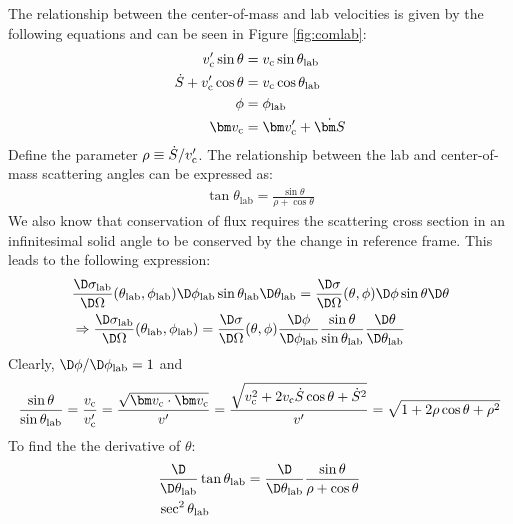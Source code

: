 \documentclass[fleqn, 12pt]{article}
\begin{document}
\begin{enumerate}
  The relationship between the center-of-mass and lab velocities is given by
  the following equations and can be seen in Figure \ref{fig:comlab}:
  \begin{align*}
    v_{\text c}' \sin \theta &= v_{\text c} \sin \theta_{\text{lab}} \\
    \dot S + v_{\text c}' \cos\theta &= v_{\text c} \cos \theta_{\text{lab}} \\
    \phi &= \phi_{\text{lab}} \\
    \bm v_{\text c} &= \bm v_{\text c}'+ \dot{\bm S}
  \end{align*}
  Define the parameter $\rho \equiv \dot S / v_{\text c}'$.  The relationship between
  the lab and center-of-mass scattering angles can be expressed as:
  \begin{align*}
  \tan\theta_{\text{lab}}=\frac{\sin\theta}{\rho+\cos\theta}
  \end{align*}
  We also know that conservation of flux requires the scattering cross section
  in an infinitesimal solid angle to be conserved by the change in reference
  frame.  This leads to the following expression:
  \begin{align*}
    &\frac{\D \sigma_{\text{lab}}}{\D \Omega} (\theta_{\text{lab}}, \phi_{\text{lab}})
      \D \phi_{\text{lab}} \sin \theta_{\text{lab}} \D \theta_{\text{lab}}
      = \frac{\D \sigma}{\D \Omega} (\theta, \phi)
      \D \phi \sin \theta \D \theta \\
    &\Rightarrow
      \frac{\D \sigma_{\text{lab}}}{\D \Omega}
      (\theta_{\text{lab}}, \phi_{\text{lab}})
      = \frac{\D \sigma}{\D \Omega} (\theta, \phi)
      \frac{\D \phi}{\D \phi_{\text{lab}}}
      \frac{\sin \theta}{\sin \theta_{\text{lab}}}
      \frac{\D \theta}{\D \theta_{\text{lab}}}
  \end{align*}
  Clearly, $\D \phi / \D\phi_{\text{lab}} = 1$ and
  \begin{align*}
    \frac{\sin \theta}{\sin \theta_{\text{lab}}}
    = \frac{v_{\text c}}{v_{\text c}'}
    = \frac{\sqrt{\bm v_{\text c} \cdot \bm v_{\text c}}}{v'}
    = \frac{\sqrt{v_{\text c}^2 + 2 v_{\text c} \dot S \cos \theta + \dot S^2}}{v'}
    = \sqrt{1 + 2 \rho \cos \theta + \rho^2}
  \end{align*}
  To find the the derivative of $\theta$:
  \begin{align*}
    &\frac{\D}{\D \theta_{\text{lab}}} \tan \theta_{\text{lab}} =
      \frac{\D}{\D \theta_{\text{lab}}} \frac{\sin \theta}{\rho + \cos \theta} \\
    &\sec^2 \theta_{\text{lab}}

\end{align*}
\end{enumerate}
\end{document}
